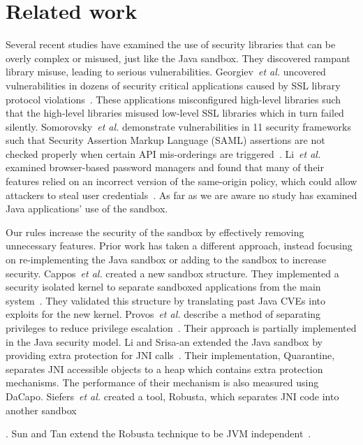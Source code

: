 \documentclass{sig-alternate}
\begin{document}
\section{Related work}
\label{sec:related}

Several recent studies have examined the use of security libraries that can be overly complex or 
misused, just like the Java sandbox. They discovered rampant library misuse,
leading to serious vulnerabilities.
Georgiev~\emph{et al.} uncovered vulnerabilities in dozens of security critical
applications caused by SSL library protocol violations~\cite{georgiev12most-dangerous}.
These applications misconfigured high-level libraries such that the
high-level libraries misused low-level SSL libraries which in turn
failed silently. Somorovsky~\emph{et al.} demonstrate vulnerabilities in
11 security frameworks such that Security Assertion Markup Language
(SAML) assertions are not checked properly when certain API mis-orderings
are triggered~\cite{somorovsky12breaking}. Li~\emph{et al.} examined browser-based
password managers and found that many of their features relied on
an incorrect version of the same-origin policy, which could allow
attackers to steal user credentials~\cite{li2014emperor}. As far
as we are aware no study has examined Java applications' use of the
sandbox. 

Our rules increase the security of the sandbox
by effectively removing unnecessary features. Prior work has taken a different
approach, instead focusing on re-implementing the Java sandbox or
adding to the sandbox to increase security. Cappos~\emph{et al.} created
a new sandbox structure. They implemented a security isolated kernel
to separate sandboxed applications from the main system~\cite{cappos_retaining_2010}.
They validated this structure by translating past Java CVEs into exploits
for the new kernel. Provos~\emph{et al.} describe a method of separating
privileges to reduce privilege escalation~\cite{Provos-PrivilegeEscalation}.
Their approach is partially implemented in the Java security model.
Li and Srisa-an extended the Java sandbox by providing extra protection
for JNI calls~\cite{li_quarantine:_2011}. Their implementation, Quarantine,
separates JNI accessible objects to a heap which contains extra protection
mechanisms. The performance of their mechanism is also measured using
DaCapo. Siefers~\emph{et al.} created a tool, Robusta, which separates JNI
code into another sandbox~\cite{siefers_robusta:_2010}%

. Sun and Tan extend the Robusta technique to be JVM independent~\cite{sun_jvm-portable_2012}. 
\end{document}
